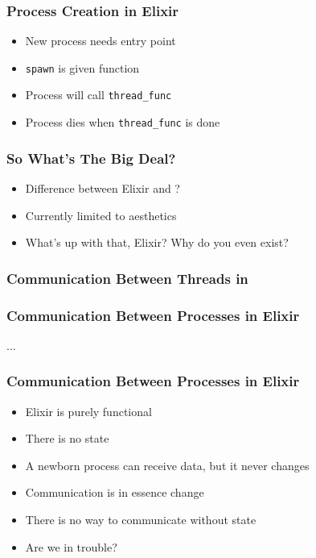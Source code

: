 \begin{frame}
    \frametitle{Process Creation in Elixir}
    \begin{itemize}
        \item New process needs entry point
        \item \texttt{spawn} is given function
        \item Process will call \texttt{thread\_func}
        \item Process dies when \texttt{thread\_func} is done
    \end{itemize}
\end{frame}

\begin{frame}
    \frametitle{So What's The Big Deal?}
    \begin{itemize}
        \item Difference between Elixir and \csharp?
        \item Currently limited to aesthetics
        \item What's up with that, Elixir? Why do you even exist?
    \end{itemize}
\end{frame}

\begin{frame}
    \frametitle{Communication Between Threads in \csharp}
\end{frame}

\begin{frame}
    \frametitle{Communication Between Processes in Elixir}
    \begin{center}
        \Huge ...
    \end{center}
\end{frame}

\begin{frame}
    \frametitle{Communication Between Processes in Elixir}
    \begin{itemize}
        \item Elixir is purely functional
        \item There is no state
        \item A newborn process can receive data, but it never changes
        \item Communication is in essence change
        \item There is no way to communicate without state
        \item Are we in trouble?
    \end{itemize}
\end{frame}

